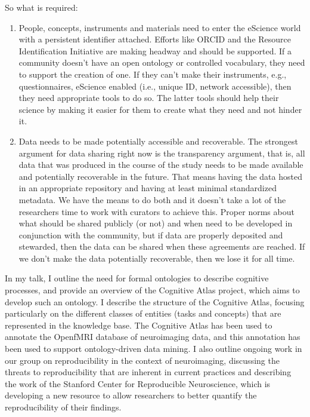 \documentclass[a4paper,USenglish]{dagrep}
\begin{document}
So what is required:

\begin{enumerate}
\item People, concepts, instruments and materials need to enter the eScience
world with a persistent identifier attached.  Efforts like ORCID and the
Resource Identification Initiative are making headway and should be supported. 
If a community doesn't have an open ontology or controlled vocabulary, they need
to support the creation of one.  If they can't make their instruments, e.g.,
questionnaires, eScience enabled (i.e., unique ID, network accessible), then
they need appropriate tools to do so.  The latter tools should help their
science by making it easier for them to create what they need and not hinder it.
\item Data needs to be made potentially accessible and recoverable.  The
strongest argument for data sharing right now is the transparency argument, that
is, all data that was produced in the course of the study needs to be made
available and potentially recoverable in the future.  That means having the data
hosted in an appropriate repository and having at least minimal standardized
metadata.  We have the means to do both and it doesn't take a lot of the
researchers time to work with curators to achieve this.  Proper norms about what
should be shared publicly (or not) and when need to be developed in conjunction
with the community, but if data are properly deposited and stewarded, then the
data can be shared when these agreements are reached.  If we don't make the data
potentially recoverable, then we lose it for all time.
\end{enumerate}


{}
\license
In my talk, I outline the need for formal ontologies to describe cognitive 
processes, and provide an overview of the Cognitive Atlas project, which aims to 
develop such an ontology.  I describe the structure of the Cognitive Atlas, 
focusing particularly on the different classes of entities (tasks and concepts)
that 
are represented in the knowledge base.  The Cognitive Atlas has been used to 
annotate the OpenfMRI database of neuroimaging data, and this annotation has 
been used to support ontology-driven data mining.  I also outline ongoing work in 
our group on reproducibility in the context of neuroimaging, discussing the 
threats to reproducibility that are inherent in current practices and describing
the 
work of the Stanford Center for Reproducible Neuroscience, which is developing a 
new resource to allow researchers to better quantify the reproducibility of their 
findings.
 
\end{document}
